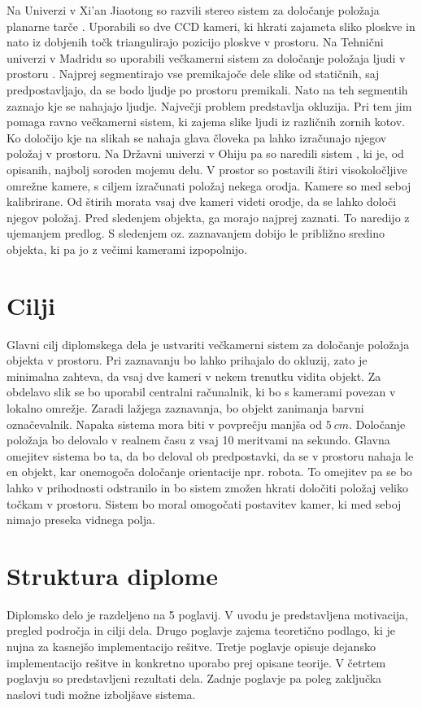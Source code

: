\documentclass[a4paper, 12pt]{book}
\begin{document}
Na Univerzi v Xi’an Jiaotong so razvili stereo sistem za določanje položaja planarne tarče \cite{li2008development}. Uporabili so dve CCD \cite{wiki:ccd} kameri, ki hkrati zajameta sliko ploskve in nato iz dobjenih točk triangulirajo pozicijo ploskve v prostoru. Na Tehnični univerzi v Madridu so uporabili večkamerni sistem za določanje položaja ljudi v prostoru \cite{mohedano2008robust}. Najprej segmentirajo vse premikajoče dele slike od statičnih, saj predpostavljajo, da se bodo ljudje po prostoru premikali. Nato na teh segmentih zaznajo kje se nahajajo ljudje. Največji problem predstavlja okluzija. Pri tem jim pomaga ravno večkamerni sistem, ki zajema slike ljudi iz različnih zornih kotov. Ko določijo kje na slikah se nahaja glava človeka pa lahko izračunajo njegov položaj v prostoru. Na Državni univerzi v Ohiju pa so naredili sistem \cite{lee2013real}, ki je, od opisanih, najbolj soroden mojemu delu. V prostor so postavili štiri visokoločljive omrežne kamere, s ciljem izračunati položaj nekega orodja. Kamere so med seboj kalibrirane. Od štirih morata vsaj dve kameri videti orodje, da se lahko določi njegov položaj. Pred sledenjem objekta, ga morajo najprej zaznati. To naredijo z ujemanjem predlog. S sledenjem oz. zaznavanjem dobijo le približno sredino objekta, ki pa jo z večimi kamerami izpopolnijo.

\section{Cilji}
Glavni cilj diplomskega dela je ustvariti večkamerni sistem za določanje položaja objekta v prostoru. Pri zaznavanju bo lahko prihajalo do okluzij, zato je minimalna zahteva, da vsaj dve kameri v nekem trenutku vidita objekt. Za obdelavo slik se bo uporabil centralni računalnik, ki bo s kamerami povezan v lokalno omrežje. Zaradi lažjega zaznavanja, bo objekt zanimanja barvni označevalnik. Napaka sistema mora biti v povprečju manjša od $5 \ cm$. Določanje položaja bo delovalo v realnem času z vsaj 10 meritvami na sekundo. Glavna omejitev sistema bo ta, da bo deloval ob predpostavki, da se v prostoru nahaja le en objekt, kar onemogoča določanje orientacije npr. robota. To omejitev pa se bo lahko v prihodnosti odstranilo in bo sistem zmožen hkrati določiti položaj veliko točkam v prostoru. Sistem bo moral omogočati postavitev kamer, ki med seboj nimajo preseka vidnega polja. 

\section{Struktura diplome}
Diplomsko delo je razdeljeno na 5 poglavij. V uvodu je predstavljena motivacija, pregled področja in cilji dela. Drugo poglavje zajema teoretično podlago, ki je nujna za kasnejšo implementacijo rešitve. Tretje poglavje opisuje dejansko implementacijo rešitve in konkretno uporabo prej opisane teorije. V četrtem poglavju so predstavljeni rezultati dela. Zadnje poglavje pa poleg zaključka naslovi tudi možne izboljšave sistema.
\end{document}
